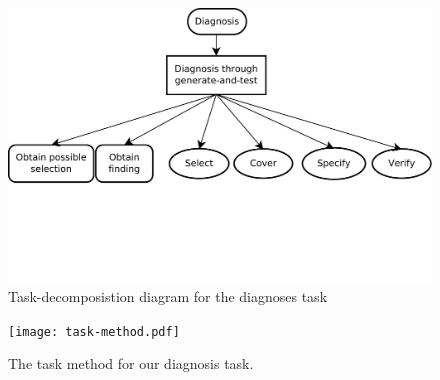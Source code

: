 \begin{figure}[htbp]
	\centering
	\includegraphics[width=1.00\textwidth]{taskDecomposition.pdf}
	\caption{Task-decomposistion diagram for the diagnoses task}
	\label{fig:taskDecomposition}
\end{figure}


\begin{figure}[htbp]
    \centering
    \texttt{[image: task-method.pdf]}
    \caption{The task method for our diagnosis task.}
    \label{fig:taskMethod}
\end{figure}
